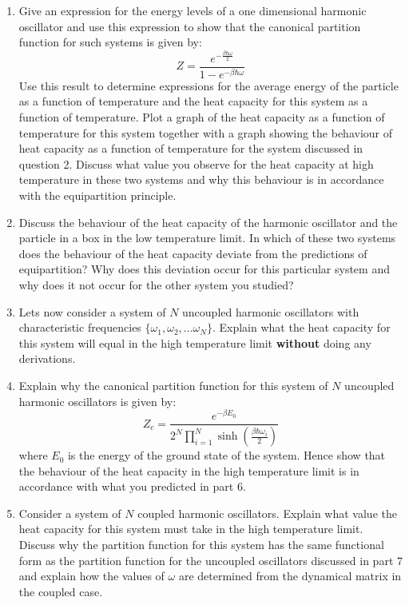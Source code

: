 \documentclass[a4paper]{article}
\begin{document}
\begin{enumerate}
\item Give an expression for the energy levels of a one dimensional harmonic oscillator and use this expression to show that the canonical partition function for such systems is given by:
$$
Z  = \frac{ e^{-\frac{\beta \hbar \omega}{2}} }{ 1 - e^{-\beta \hbar \omega} }
$$
Use this result to determine expressions for the average energy of the particle as a function of temperature and the heat capacity for this system as a function of temperature.  Plot a graph of the heat capacity as a function of temperature for this system together with a graph showing the behaviour of heat capacity as a function of temperature for the system discussed in question 2.  Discuss what value you observe for the heat capacity at high temperature in these two systems and why this behaviour is in accordance with the equipartition principle.

\item Discuss the behaviour of the heat capacity of the harmonic oscillator and the particle in a box in the low temperature limit.  In which of these two systems does the behaviour of the heat capacity deviate from the predictions of equipartition?  Why does this deviation occur for this particular system and why does it not occur for the other system you studied?  

\item Lets now consider a system of $N$ uncoupled harmonic oscillators with characteristic frequencies $\{ \omega_1, \omega_2, \dots \omega_N\}$.  Explain what the heat capacity for this system will equal in the high temperature limit {\bfseries without} doing any derivations.

\item Explain why the canonical partition function for this system of $N$ uncoupled harmonic oscillators is given by:
$$
Z_c = \frac{e^{-\beta E_0}}{2^N \prod_{i=1}^N \sinh\left( \frac{\beta \hbar \omega_i}{2} \right)}
$$      
where $E_0$ is the energy of the ground state of the system.  Hence show that the behaviour of the heat capacity in the high temperature limit is in accordance with what you predicted in part 6.

\item Consider a system of $N$ coupled harmonic oscillators.  Explain what value the heat capacity for this system must take in the high temperature limit.  Discuss why the partition function for this system has the same functional form as the partition function for the uncoupled oscillators discussed in part 7 and explain how the values of $\omega$ are determined from the dynamical matrix in the coupled case.


\end{enumerate}
\end{document}
